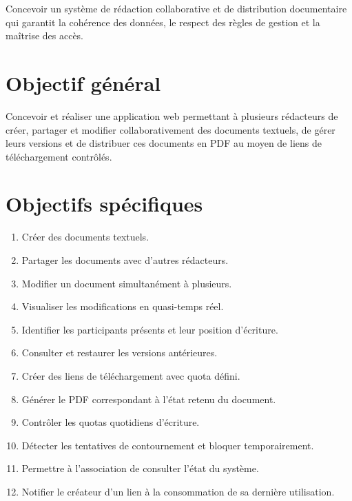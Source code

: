\begin{objectifbox}
Concevoir un système de rédaction collaborative et de distribution documentaire qui garantit la cohérence des données, le respect des règles de gestion et la maîtrise des accès.
\end{objectifbox}

\section{Objectif général}

Concevoir et réaliser une application web permettant à plusieurs rédacteurs de créer, partager et modifier collaborativement des documents textuels, de gérer leurs versions et de distribuer ces documents en PDF au moyen de liens de téléchargement contrôlés.

\section{Objectifs spécifiques}

\begin{enumerate}
    \item Créer des documents textuels.
    \item Partager les documents avec d'autres rédacteurs.
    \item Modifier un document simultanément à plusieurs.
    \item Visualiser les modifications en quasi-temps réel.
    \item Identifier les participants présents et leur position d'écriture.
    \item Consulter et restaurer les versions antérieures.
    \item Créer des liens de téléchargement avec quota défini.
    \item Générer le PDF correspondant à l'état retenu du document.
    \item Contrôler les quotas quotidiens d'écriture.
    \item Détecter les tentatives de contournement et bloquer temporairement.
    \item Permettre à l'association de consulter l'état du système.
    \item Notifier le créateur d'un lien à la consommation de sa dernière utilisation.
\end{enumerate}

